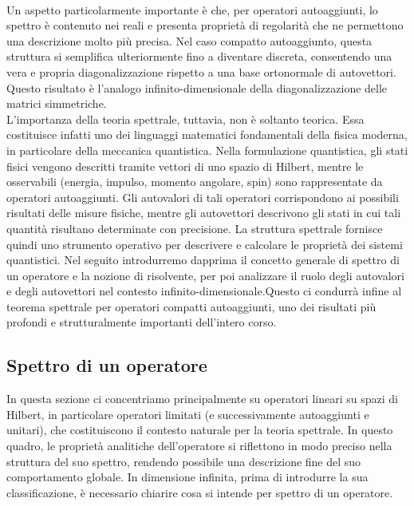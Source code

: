 \documentclass[a4paper,12pt]{report}
\begin{document}
\\Un aspetto particolarmente importante è che, per operatori autoaggiunti, lo spettro è contenuto nei reali e presenta proprietà di regolarità che ne permettono una descrizione molto più precisa. Nel caso compatto autoaggiunto, questa struttura si semplifica ulteriormente fino a diventare discreta, consentendo una vera e propria diagonalizzazione rispetto a una base ortonormale di autovettori. Questo risultato è l’analogo infinito-dimensionale della diagonalizzazione delle matrici simmetriche.
\\L’importanza della teoria spettrale, tuttavia, non è soltanto teorica. Essa costituisce infatti uno dei linguaggi matematici fondamentali della fisica moderna, in particolare della meccanica quantistica. Nella formulazione quantistica, gli stati fisici vengono descritti tramite vettori di uno spazio di Hilbert, mentre le osservabili (energia, impulso, momento angolare, spin) sono rappresentate da operatori autoaggiunti. Gli autovalori di tali operatori corrispondono ai possibili risultati delle misure fisiche, mentre gli autovettori descrivono gli stati in cui tali quantità risultano determinate con precisione. La struttura spettrale fornisce quindi uno strumento operativo per descrivere e calcolare le proprietà dei sistemi quantistici. Nel seguito introdurremo dapprima il concetto generale di spettro di un operatore e la nozione di risolvente, per poi analizzare il ruolo degli autovalori e degli autovettori nel contesto infinito-dimensionale.Questo ci condurrà infine al teorema spettrale per operatori compatti autoaggiunti, uno dei risultati più profondi e strutturalmente importanti dell’intero corso.

\newpage

\subsection{Spettro di un operatore}

In questa sezione ci concentriamo principalmente su operatori lineari su spazi di Hilbert, in particolare operatori limitati (e successivamente autoaggiunti e unitari), che costituiscono il contesto naturale per la teoria spettrale. In questo quadro, le proprietà analitiche dell’operatore si riflettono in modo preciso nella struttura del suo spettro, rendendo possibile una descrizione fine del suo comportamento globale. In dimensione infinita, prima di introdurre la sua classificazione, è necessario chiarire cosa si intende per spettro di un operatore. 
\end{document}
